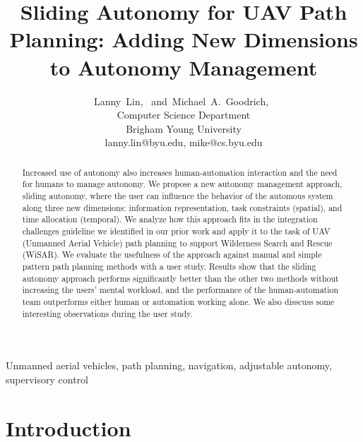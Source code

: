 \documentclass[journal]{IEEEtran}
\begin{document}
\title{Sliding Autonomy for UAV Path Planning: Adding New Dimensions to Autonomy Management}

\author{
Lanny~Lin,~
and~Michael~A.~Goodrich,~%
\\Computer Science Department \\ Brigham Young University \\ lanny.lin@byu.edu, mike@cs.byu.edu
}

\maketitle

\begin{abstract}
Increased use of autonomy also increases human-automation interaction and the need for humans to manage autonomy. We propose a new autonomy management approach, sliding autonomy, where the user can influence the behavior of the automous system along three new dimensions: information representation, task constraints (spatial), and time allocation (temporal). We analyze how this approach fits in the integration challenges guideline we identified in our prior work and apply it to the task of UAV (Unmanned Aerial Vehicle) path planning to support Wilderness Search and Rescue (WiSAR). We evaluate the usefulness of the approach against manual and simple pattern path planning methods with a user study. Results show that the sliding autonomy approach performs significantly better than the other two methods without increasing the users' mental workload, and the performance of the human-automation team outperforms either human or automation working alone. We also disscuss some interesting observations during the user study.
\end{abstract}


\begin{IEEEkeywords}
Unmanned aerial vehicles, path planning, navigation, adjustable autonomy, supervisory control
\end{IEEEkeywords}

\IEEEpeerreviewmaketitle


\section{Introduction}
\label{sec:Introduction6}
\end{document}
